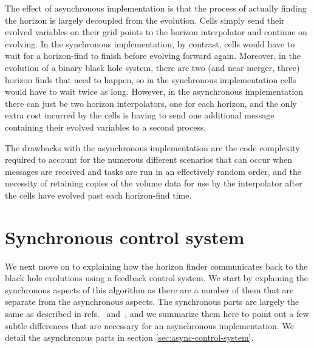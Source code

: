 \begin{bibunit}[unsrtnat]
The effect of asynchronous implementation is that the process of actually
finding the horizon is largely decoupled from the evolution. Cells simply send
their evolved variables on their grid points to the horizon interpolator and
continue on evolving. In the synchronous implementation, by contrast, cells
would have to wait for a horizon-find to finish before evolving forward again.
Moreover, in the evolution of a binary black hole system, there are two (and
near merger, three) horizon
finds that need to happen, so in the synchronous implementation cells would have
to wait twice as long. However, in the asynchronous implementation there can
just be two horizon interpolators, one for each horizon, and the only extra cost
incurred by the cells is having to send one additional message containing their
evolved variables to a second process.

The drawbacks with the asynchronous implementation are the code complexity
required to account for the numerous different scenarios that can occur when
messages are received and tasks are run in an effectively random order, and the
necessity of retaining copies of the volume data for use by the interpolator
after the cells have evolved past each horizon-find time.

\section{Synchronous control system\label{sec:sync-control-system}}

We next move on to explaining how the horizon finder communicates back to the
black hole evolutions using a feedback control system. We start by explaining
the synchronous aspects of this algorithm as there are a number of them that are
separate from the asynchronous aspects. The synchronous parts are largely the
same as described in refs.~\cite{Scheel:2006gg} and~\cite{Hemberger:2012jz}, and
we summarize them here to point out a few subtle differences that are necessary
for an asynchronous implementation.  We detail the asynchronous parts in
section \ref{sec:async-control-system}.


\end{bibunit}
